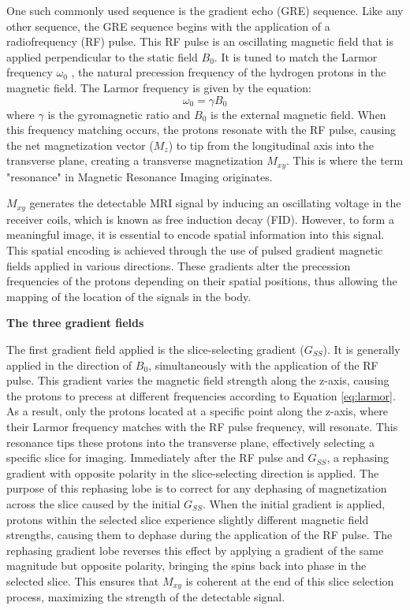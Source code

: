 \documentclass{micro-econ-thesis}
\begin{document}
One such commonly used sequence is the gradient echo (GRE) sequence. Like any other sequence, the GRE sequence begins with the application of a radiofrequency (RF) pulse. This RF pulse is an oscillating magnetic field that is applied perpendicular to the static field \textbf{$B_0$}. It is tuned to match the Larmor frequency $\omega_0$ , the natural precession frequency of the hydrogen protons in the magnetic field. The Larmor frequency is given by the equation:
\begin{equation}
	\omega_0 = \gamma B_0
	\label{eq:larmor}
\end{equation}
where $\gamma$ is the gyromagnetic ratio and $B_0$ is the external magnetic field.
When this frequency matching occurs, the protons resonate with the RF pulse, causing the net magnetization vector (\textbf{$M_z$}) to tip from the longitudinal axis into the transverse plane, creating a transverse magnetization \textbf{$M_{xy}$}. This is where the term "resonance" in Magnetic Resonance Imaging originates. 

\textbf{$M_{xy}$} generates the detectable MRI signal by inducing an oscillating voltage in the receiver coils, which is known as free induction decay (FID). However, to form a meaningful image, it is essential to encode spatial information into this signal. This spatial encoding is achieved through the use of pulsed gradient magnetic fields applied in various directions. These gradients alter the precession frequencies of the protons depending on their spatial positions, thus allowing the mapping of the location of the signals in the body.  

\textbf{The three gradient fields}

The first gradient field applied is the slice-selecting gradient ($G_{SS}$). It is generally applied in the direction of \textbf{$B_0$}, simultaneously with the application of the RF pulse. 
This gradient varies the magnetic field strength along the z-axis, causing the protons to precess at different frequencies according to Equation \ref{eq:larmor}. As a result, only the protons located at a specific point along the z-axis, where their Larmor frequency matches with the RF pulse frequency, will resonate. This resonance tips these protons into the transverse plane, effectively selecting a specific slice for imaging. Immediately after the RF pulse and $G_{SS}$, a rephasing gradient with opposite polarity in the slice-selecting direction is applied. The purpose of this rephasing lobe is to correct for any dephasing of magnetization across the slice caused by the initial  $G_{SS}$. When the initial gradient is applied, protons within the selected slice experience slightly different magnetic field strengths, causing them to dephase during the application of the RF pulse. The rephasing gradient lobe reverses this effect by applying a gradient of the same magnitude but opposite polarity, bringing the spins back into phase in the selected slice. This ensures that \textbf{$M_{xy}$} is coherent at the end of this slice selection process, maximizing the strength of the detectable signal.
\end{document}
